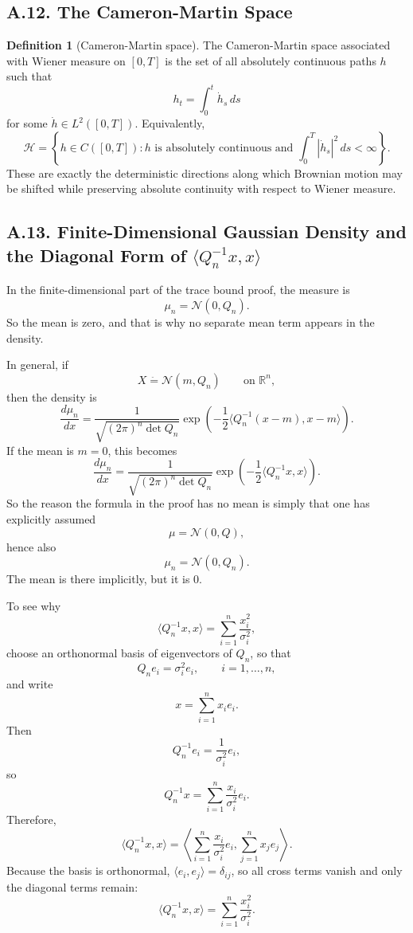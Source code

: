 \documentclass[11pt]{article}
\theoremstyle{definition}
\newtheorem{definition}{Definition}
\theoremstyle{remark}
\begin{document}
\subsection*{A.12. The Cameron-Martin Space}
\begin{definition}[Cameron-Martin space]
The Cameron-Martin space associated with Wiener measure on $[0,T]$ is the set of all absolutely continuous paths $h$ such that
\[
h_t=\int_0^t \dot h_s\,ds
\]
for some $\dot h\in L^2([0,T])$.
Equivalently,
\[
\mathcal H
=
\left\{
h\in C([0,T]) : h \text{ is absolutely continuous and }
\int_0^T |\dot h_s|^2\,ds<\infty
\right\}.
\]
These are exactly the deterministic directions along which Brownian motion may be shifted while preserving absolute continuity with respect to Wiener measure.
\end{definition}

\subsection*{A.13. Finite-Dimensional Gaussian Density and the Diagonal Form of \(\langle Q_n^{-1}x,x\rangle\)}
In the finite-dimensional part of the trace bound proof, the measure is
\[
\mu_n=\mathcal N(0,Q_n).
\]
So the mean is zero, and that is why no separate mean term appears in the density.

In general, if
\[
X\stackrel{\hat{\ }}{=}\mathcal N(m,Q_n)
\qquad \text{on } \mathbb R^n,
\]
then the density is
\[
\frac{d\mu_n}{dx}
=
\frac{1}{\sqrt{(2\pi)^n\det Q_n}}
\exp\left(-\frac12\langle Q_n^{-1}(x-m),x-m\rangle\right).
\]
If the mean is \(m=0\), this becomes
\[
\frac{d\mu_n}{dx}
=
\frac{1}{\sqrt{(2\pi)^n\det Q_n}}
\exp\left(-\frac12\langle Q_n^{-1}x,x\rangle\right).
\]
So the reason the formula in the proof has no mean is simply that one has explicitly assumed
\[
\mu=\mathcal N(0,Q),
\]
hence also
\[
\mu_n=\mathcal N(0,Q_n).
\]
The mean is there implicitly, but it is \(0\).

To see why
\[
\langle Q_n^{-1}x,x\rangle
=
\sum_{i=1}^n \frac{x_i^2}{\sigma_i^2},
\]
choose an orthonormal basis of eigenvectors of \(Q_n\), so that
\[
Q_n e_i=\sigma_i^2 e_i,
\qquad i=1,\dots,n,
\]
and write
\[
x=\sum_{i=1}^n x_i e_i.
\]
Then
\[
Q_n^{-1}e_i=\frac{1}{\sigma_i^2}e_i,
\]
so
\[
Q_n^{-1}x
=
\sum_{i=1}^n \frac{x_i}{\sigma_i^2}e_i.
\]
Therefore,
\[
\langle Q_n^{-1}x,x\rangle
=
\left\langle
\sum_{i=1}^n \frac{x_i}{\sigma_i^2}e_i,
\sum_{j=1}^n x_j e_j
\right\rangle.
\]
Because the basis is orthonormal, \(\langle e_i,e_j\rangle=\delta_{ij}\), so all cross terms vanish and only the diagonal terms remain:
\[
\langle Q_n^{-1}x,x\rangle
=
\sum_{i=1}^n \frac{x_i^2}{\sigma_i^2}.
\]
\end{document}

